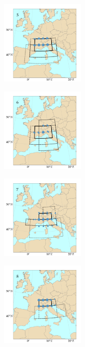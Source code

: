 \documentclass[twocol]{ametsoc}
\begin{document}
\begin{figure}[htb]
\begin{subfigure}{.5\columnwidth}
	\end{subfigure}
	\begin{subfigure}{.5\columnwidth}
		\centering
		\includegraphics[width=4cm]{figures/spatial_win_z4-hi4/Spatial_windows_5.png}
	\end{subfigure}%
	\begin{subfigure}{.5\columnwidth}
		\centering
		\includegraphics[width=4cm]{figures/spatial_win_z4-hi4/Spatial_windows_6.png}
	\end{subfigure}
	\begin{subfigure}{.5\columnwidth}
		\centering
		\includegraphics[width=4cm]{figures/spatial_win_z4-hi4/Spatial_windows_7.png}
	\end{subfigure}%
	\begin{subfigure}{.5\columnwidth}
		\centering
		\includegraphics[width=4cm]{figures/spatial_win_z4-hi4/Spatial_windows_8.png}
	\end{subfigure}

\end{figure}
\end{document}
